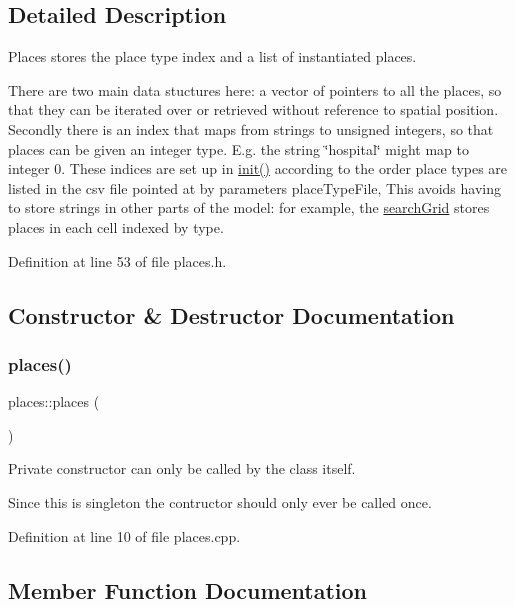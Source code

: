\subsection{Detailed Description}
Places stores the place type index and a list of instantiated places. 

There are two main data stuctures here\+: a vector of pointers to all the places, so that they can be iterated over or retrieved without reference to spatial position. Secondly there is an index that maps from strings to unsigned integers, so that places can be given an integer type. E.\+g. the string \char`\"{}hospital\char`\"{} might map to integer 0. These indices are set up in \mbox{\hyperlink{classplaces_ad126c2796c4fecad43f8e237ffde786d}{init()}} according to the order place types are listed in the csv file pointed at by parameters place\+Type\+File, This avoids having to store strings in other parts of the model\+: for example, the \mbox{\hyperlink{classsearchGrid}{search\+Grid}} stores places in each cell indexed by type. 

Definition at line 53 of file places.\+h.



\subsection{Constructor \& Destructor Documentation}
\mbox{\label{classplaces_a1c4116c838392a6d35169126334f3f61}} 
\subsubsection{\texorpdfstring{places()}{places()}}
{\footnotesize\ttfamily places\+::places (\begin{DoxyParamCaption}{ }\end{DoxyParamCaption})\hspace{0.3cm}{\ttfamily [protected]}}



Private constructor can only be called by the class itself. 

Since this is singleton the contructor should only ever be called once. 

Definition at line 10 of file places.\+cpp.



\subsection{Member Function Documentation}
\mbox{\label{classplaces_acb5dbcd8606a8a1ffbebc9fb5a3c8a5e}} 
